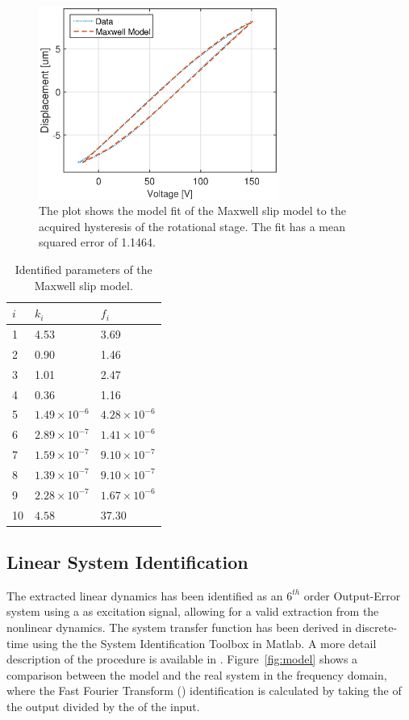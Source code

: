 \begin{figure}[h]
  \centering
  \includegraphics[width=0.7\textwidth]{fig/matlab/maxwell.eps}
  \caption{\label{fig:maxwell} The plot shows the model fit of the Maxwell slip model to the acquired hysteresis of the rotational stage. The fit has a mean squared error of 1.1464.}
\end{figure}

\begin{table}[h!]
  \centering
  \begin{tabular}{| l | l | l |}
    \hline
    $i$ & $k_i$ & $f_i$ \\ \hline
    1 & 4.53 & 3.69 \\
    2 & 0.90 & 1.46 \\
    3 & 1.01 & 2.47 \\
    4 & 0.36 & 1.16 \\
    5 & $1.49 \times 10^{-6}$ & $4.28 \times 10^{-6}$ \\
    6 & $2.89 \times 10^{-7}$ & $1.41 \times 10^{-6}$ \\
    7 & $1.59 \times 10^{-7}$ & $9.10 \times 10^{-7}$ \\
    8 & $1.39 \times 10^{-7}$ & $9.10 \times 10^{-7}$ \\
    9 & $2.28 \times 10^{-7}$ & $1.67 \times 10^{-6}$ \\
    10 & $4.58$ & 37.30 \\
    \hline
  \end{tabular}
  \caption{\label{tab:maxwell} Identified parameters of the Maxwell slip model.}
\end{table}

\subsection{Linear System Identification}
\label{sec:linsys}
The extracted linear dynamics has been identified as an $6^{th}$ order Output-Error system using a \abbrPRBS as excitation signal, allowing for a valid extraction from the nonlinear dynamics. The system transfer function has been derived in discrete-time using the the System Identification Toolbox in Matlab. A more detail description of the procedure is available in \citep{ButcherController:2015}. Figure~\ref{fig:model} shows a comparison between the model and the real system in the frequency domain, where the Fast Fourier Transform (\abbrFFT) identification is calculated by taking the \abbrFFT of the output divided by the \abbrFFT of the input.

